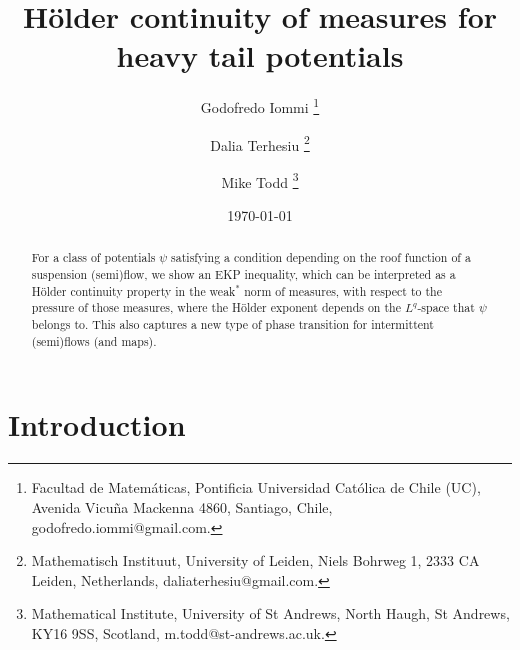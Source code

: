 \documentclass[12pt]{article}
\title{H\"older continuity of measures for heavy tail potentials}
\author{Godofredo Iommi
 \thanks{Facultad de Matem\'aticas,
Pontificia Universidad Cat\'olica de Chile (UC), Avenida Vicu\~na Mackenna 4860, Santiago, Chile, godofredo.iommi@gmail.com.}
\and
Dalia Terhesiu
\thanks{Mathematisch Instituut,
University of Leiden, Niels Bohrweg 1, 2333 CA Leiden, Netherlands, daliaterhesiu@gmail.com.
}
\and
{Mike Todd}
\thanks{Mathematical Institute,
University of St Andrews,
North Haugh,
St Andrews,
KY16 9SS,
Scotland, m.todd@st-andrews.ac.uk.
}
}
\date{\today}
\numberwithin{equation}{section}
\begin{document}
\maketitle







\begin{abstract}
   For a class of potentials $\psi$ satisfying a condition depending on the roof function of a suspension (semi)flow,
 we show an EKP inequality, which can be interpreted as a H\"older continuity property in the weak${^*}$ norm of measures, with respect to the pressure of those measures,
 where the H\"older exponent depends on the $L^q$-space that $\psi$ belongs to. This also captures a new type of phase transition for intermittent (semi)flows (and maps).
\end{abstract}




\section{Introduction}
\end{document}
